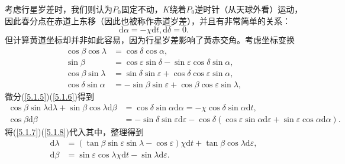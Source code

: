 \documentclass[11pt, a4paper, oneside]{ctexart}
\numberwithin{equation}{subsection}
\begin{document}
考虑行星岁差时，我们则认为$P_{0}$固定不动，$K$绕着$P_{0}$逆时针（从天球外看）运动，因此春分点在赤道上东移（因此也被称作赤道岁差），并且有非常简单的关系：
\begin{equation}
\mathrm{d}\alpha=-\chi\mathrm{d}t,\mathrm{d}\delta=0.
\end{equation}
但计算黄道坐标却并非如此容易，因为行星岁差影响了黄赤交角。考虑坐标变换
\begin{align}
\cos\beta\cos\lambda&=\cos\delta\cos\alpha,\label{5.1.5}\\
\sin\beta&=\cos\varepsilon\sin\delta-\sin\varepsilon\cos\delta\sin\alpha,\label{5.1.6}\\
\cos\beta\sin\lambda&=\sin\delta\sin\varepsilon+\cos\delta\cos\varepsilon\sin\alpha,\label{5.1.7}\\
\cos\delta\sin\alpha&=-\sin\beta\sin\varepsilon+\cos\beta\cos\varepsilon\sin\lambda,\label{5.1.8}
\end{align}
微分(\ref{5.1.5})(\ref{5.1.6})得到
\begin{align}
\cos\beta\sin\lambda\mathrm{d}\lambda+\sin\beta\cos\lambda\mathrm{d}\beta&=\cos\delta{}\sin\alpha\mathrm{d}\alpha=-\chi\cos\delta{}\sin\alpha\mathrm{d}t,\\
\cos\beta\mathrm{d}\beta&=-\sin\delta{}\sin\varepsilon\mathrm{d}\varepsilon-\cos\delta{}\left(\cos\varepsilon\sin\alpha\mathrm{d}\varepsilon+\sin\varepsilon\cos\alpha\mathrm{d}\alpha\right).
\end{align}
将(\ref{5.1.7})(\ref{5.1.8})代入其中，整理得到
\begin{align}
\mathrm{d}\lambda&=\left(\tan\beta\sin\varepsilon\sin\lambda-\cos\varepsilon\right)\chi\mathrm{d}t+\tan\beta\cos\lambda\mathrm{d}\varepsilon,\\
\mathrm{d}\beta&=\sin\varepsilon\cos\lambda\chi\mathrm{d}t-\sin\lambda\mathrm{d}\varepsilon.
\end{align}
\end{document}
